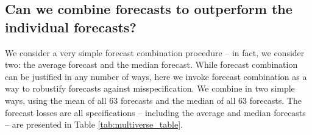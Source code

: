 \documentclass[11pt,3p,review,authoryear]{elsarticle}
\theoremstyle{definition}
\begin{document}


\subsection{Can we combine forecasts to outperform the individual forecasts?}\label{forecastcomb}

We consider a very simple forecast combination procedure -- in fact, we consider two: the average forecast and the median forecast.  While forecast combination can be justified in any number of ways, here we invoke forecast combination as a way to robustify forecasts against misspecification.  We combine in two simple ways, using the mean of all 63 forecasts and the median of all 63 forecasts.  The forecast losses are all specifications -- including the average and median forecasts -- are presented in Table \ref{tab:multiverse_table}.
\end{document}
